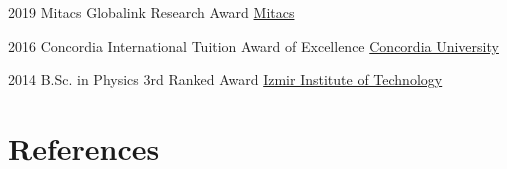 \documentclass[]{friggeri-cv}
\begin{document}
\begin{entrylist}
	
\entry
{2019}
{Mitacs Globalink Research Award}
{\href{https://www.mitacs.ca/en/programs/globalink/globalink-research-award}{Mitacs}} 	
	
	


\entry
{2016}
{Concordia International Tuition Award of Excellence}
{\href{http://www.concordia.ca}{Concordia University}} 	


\entry
{2014}
{B.Sc. in Physics 3rd Ranked Award}
{\href{http://www.iyte.edu.tr/AnaSayfa.aspx?d=ENG}{Izmir Institute of Technology}} 	
	
	
\end{entrylist}	
	

\section{References}
	
\end{document}
